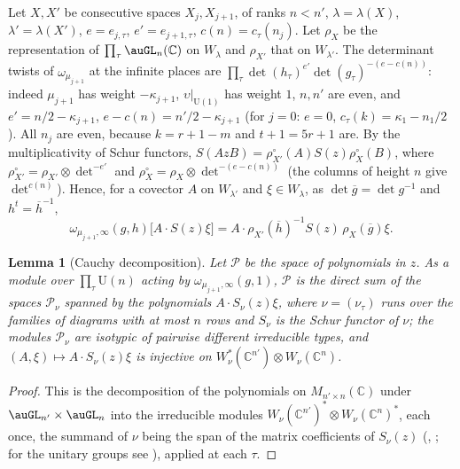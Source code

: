 \documentclass[10pt]{amsart}
\newtheorem{lemma}[theorem]{Lemma}
\theoremstyle{definition}
\theoremstyle{remark}
\newcommand{\C}{\mathbb C}
\providecommand{\auU}{\mathrm U}
\providecommand{\aubar}[1]{\overline{#1}}
\begin{document}
Let $X,X'$ be consecutive spaces $X_j,X_{j+1}$, of ranks $n<n'$, $\lambda=\lambda(X)$,
$\lambda'=\lambda(X')$, $e=e_{j,\tau}$, $e'=e_{j+1,\tau}$, $c(n)=c_\tau(n_j)$. Let $\rho_X$ be the
representation of $\prod_\tau\auGL_n(\C)$ on $W_\lambda$ and $\rho_{X'}$ that on $W_{\lambda'}$. The
determinant twists of $\omega_{\mu_{j+1}}$ at the infinite places are $\prod_\tau\det(h_\tau)^{e'}
\det(g_\tau)^{-(e-c(n))}$: indeed $\mu_{j+1}$ has weight $-\kappa_{j+1}$, $\upsilon|_{\auU(1)}$ has
weight $1$, $n,n'$ are even, and $e'=n/2-\kappa_{j+1}$, $e-c(n)=n'/2-\kappa_{j+1}$ (for $j=0$:
$e=0$, $c_\tau(k)=\kappa_1-n_1/2$). All $n_j$ are even, because $k=r+1-m$ and $t+1=5r+1$ are. By
the multiplicativity of Schur functors, $S(AzB)=\rho^{\circ}_{X'}(A)S(z)\rho^\circ_X(B)$, where
$\rho^\circ_{X'}=\rho_{X'}\otimes\det^{-e'}$ and $\rho_X^\circ=\rho_X\otimes\det^{-(e-c(n))}$ (the
columns of height $n$ give $\det^{c(n)}$). Hence, for a covector $A$ on $W_{\lambda'}$ and
$\xi\in W_\lambda$, as $\det\aubar g=\det g^{-1}$ and $h^t=\aubar h^{-1}$,
\begin{equation}\label{pk:eq-schuract}
\omega_{\mu_{j+1},\infty}(g,h)\bigl[A\cdot S(z)\xi\bigr]=A\cdot\rho_{X'}(\aubar h)^{-1}S(z)\,\rho_X(\aubar
g)\xi .
\end{equation}

\begin{lemma}[Cauchy decomposition]\label{pk:cauchy}
Let $\mathcal P$ be the space of polynomials in $z$. As a module over $\prod_\tau\auU(n)$ acting by
$\omega_{\mu_{j+1},\infty}(g,1)$, $\mathcal P$ is the direct sum of the spaces $\mathcal P_\nu$
spanned by the polynomials $A\cdot S_\nu(z)\xi$, where $\nu=(\nu_\tau)$ runs over the families of
diagrams with at most $n$ rows and $S_\nu$ is the Schur functor of $\nu$; the modules
$\mathcal P_\nu$ are isotypic of pairwise different irreducible types, and $(A,\xi)\mapsto A\cdot
S_\nu(z)\xi$ is injective on $W^*_{\nu}(\C^{n'})\otimes W_\nu(\C^n)$.
\end{lemma}
\begin{proof}
This is the decomposition of the polynomials on $M_{n'\times n}(\C)$ under $\auGL_{n'}\times\auGL_n$
into the irreducible modules $W_\nu(\C^{n'})^*\otimes W_\nu(\C^n)^*$, each once, the summand of
$\nu$ being the span of the matrix coefficients of $S_\nu(z)$
(\cite{HoweTheta}, \cite[Theorem~5.6.7]{GoodmanWallach}; for the unitary groups see
\cite[Ch.~III, Proposition~5.6]{KashiwaraVergne}), applied at each $\tau$.
\end{proof}
\end{document}
